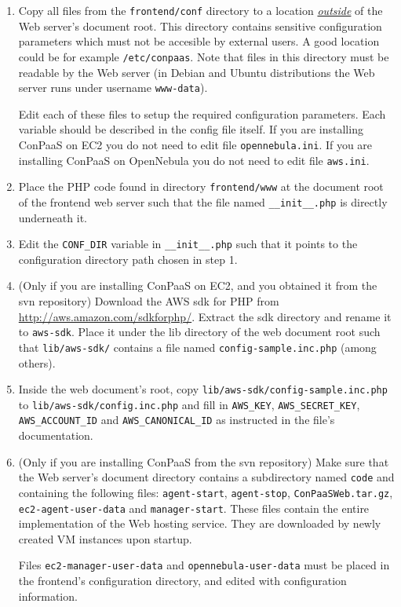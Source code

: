 \documentclass[10pt]{article}
\begin{document}
\begin{enumerate}
\item Copy all files from the \verb+frontend/conf+ directory to a
  location \uline{\emph{outside}} of the Web server's document root.
  This directory contains sensitive configuration parameters which
  must not be accesible by external users. A good location could be
  for example \verb+/etc/conpaas+. Note that files in this
  directory must be readable by the Web server (in Debian and Ubuntu
  distributions the Web server runs under username \verb+www-data+).

  Edit each of these files to setup the required configuration
  parameters. Each variable should be described in the config file
  itself. If you are installing ConPaaS on EC2 you do not need to edit
  file \verb+opennebula.ini+. If you are installing ConPaaS on
  OpenNebula you do not need to edit file \verb+aws.ini+.

\item Place the PHP code found in directory \verb+frontend/www+ at the
  document root of the frontend web server such that the file named
  \verb+__init__.php+ is directly underneath it.

\item Edit the \verb+CONF_DIR+ variable in \verb+__init__.php+ such
  that it points to the configuration directory path chosen in step 1.

\item (Only if you are installing ConPaaS on EC2, and you obtained it 
  from the svn repository) Download the AWS sdk for PHP from
  \url{http://aws.amazon.com/sdkforphp/}.  Extract the sdk directory
  and rename it to \verb+aws-sdk+. Place it under the lib directory of
  the web document root such that \verb+lib/aws-sdk/+ contains a
  file named \verb+config-sample.inc.php+ (among others).

\item Inside the web document's root, copy
  \verb+lib/aws-sdk/config-sample.inc.php+ to
  \verb+lib/aws-sdk/config.inc.php+ and fill in \verb+AWS_KEY+,
  \verb+AWS_SECRET_KEY+, \verb+AWS_ACCOUNT_ID+ and
  \verb+AWS_CANONICAL_ID+ as instructed in the file's documentation.

\item (Only if you are installing ConPaaS from the svn repository)
  Make sure that the Web server's document directory contains a
  subdirectory named \verb+code+ and containing the following files:
  \verb+agent-start+, \verb+agent-stop+, \verb+ConPaaSWeb.tar.gz+,
  \verb+ec2-agent-user-data+ and \verb+manager-start+. These files
  contain the entire implementation of the Web hosting service. They
  are downloaded by newly created VM instances upon startup.

  Files \verb+ec2-manager-user-data+ and \verb+opennebula-user-data+
  must be placed in the frontend's configuration directory, and edited
  with configuration information.
 
\end{enumerate}
\end{document}
